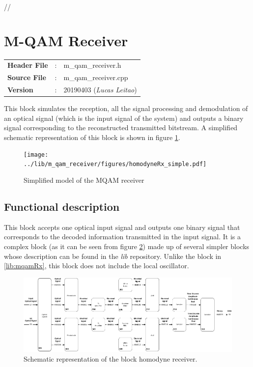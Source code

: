 \clearpage
//%

\section{M-QAM Receiver}\label{lib:homodyneRx}

\begin{tcolorbox}	
	\begin{tabular}{p{2.75cm} p{0.2cm} p{10.5cm}} 	
		\textbf{Header File}   &:& m\_qam\_receiver.h \\
		\textbf{Source File}   &:& m\_qam\_receiver.cpp \\
        \textbf{Version}       &:& 20190403 (\emph{Lucas Leitao})\\
	\end{tabular}
\end{tcolorbox}

This block simulates the reception, all the signal processing and demodulation of an optical
signal (which is the input signal of the system) and outputs a binary signal
corresponding to the reconstructed transmitted bitstream.
 A simplified schematic representation of this block is shown in
figure
\ref{fig:homodyneRx_simple}.

\begin{figure}[h]
	\centering
	\texttt{[image: ../lib/m\_qam\_receiver/figures/homodyneRx\_simple.pdf]}
	\caption{Simplified model of the MQAM
	receiver}\label{fig:homodyneRx_simple}
\end{figure}

\subsection*{Functional description}

This block accepts one optical input signal and outputs one binary signal that
corresponds to the decoded information transmitted in the input signal. It is a
complex
block (as it can be seen from figure \ref{fig:homodyneRx_blocks}) made up of
several simpler blocks whose description can be found in the
\textit{lib} repository. Unlike the block in \ref{lib:mqamRx}, this block does
not include the local oscillator.

\begin{figure}[h]
	\centering
	\includegraphics[width=\textwidth]{../lib/m_qam_receiver/figures/homodyneRx_blocks.pdf}
	\caption{Schematic representation of the block homodyne
	receiver.}\label{fig:homodyneRx_blocks}
\end{figure}

